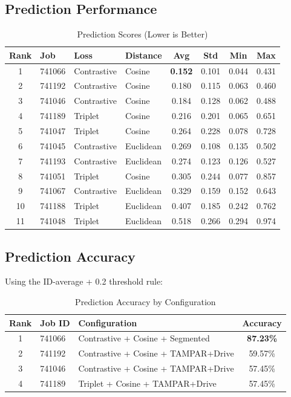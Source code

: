 \documentclass[12pt,a4paper]{article}
\begin{document}
\subsection{Prediction Performance}

\begin{table}[H]
\centering
\caption{Prediction Scores (Lower is Better)}
\label{tab:prediction_scores}
\begin{tabular}{clllcccc}
\toprule
\textbf{Rank} & \textbf{Job} & \textbf{Loss} & \textbf{Distance} & \textbf{Avg} & \textbf{Std} & \textbf{Min} & \textbf{Max} \\
\midrule
1 & 741066 & Contrastive & Cosine & \textbf{0.152} & 0.101 & 0.044 & 0.431 \\
2 & 741192 & Contrastive & Cosine & 0.180 & 0.115 & 0.063 & 0.460 \\
3 & 741046 & Contrastive & Cosine & 0.184 & 0.128 & 0.062 & 0.488 \\
4 & 741189 & Triplet & Cosine & 0.216 & 0.201 & 0.065 & 0.651 \\
5 & 741047 & Triplet & Cosine & 0.264 & 0.228 & 0.078 & 0.728 \\
6 & 741045 & Contrastive & Euclidean & 0.269 & 0.108 & 0.135 & 0.502 \\
7 & 741193 & Contrastive & Euclidean & 0.274 & 0.123 & 0.126 & 0.527 \\
8 & 741051 & Triplet & Cosine & 0.305 & 0.244 & 0.077 & 0.857 \\
9 & 741067 & Contrastive & Euclidean & 0.329 & 0.159 & 0.152 & 0.643 \\
10 & 741188 & Triplet & Euclidean & 0.407 & 0.185 & 0.242 & 0.762 \\
11 & 741048 & Triplet & Euclidean & 0.518 & 0.266 & 0.294 & 0.974 \\
\bottomrule
\end{tabular}
\end{table}

\subsection{Prediction Accuracy}

Using the ID-average + 0.2 threshold rule:

\begin{table}[H]
\centering
\caption{Prediction Accuracy by Configuration}
\label{tab:prediction_accuracy}
\begin{tabular}{cllc}
\toprule
\textbf{Rank} & \textbf{Job ID} & \textbf{Configuration} & \textbf{Accuracy} \\
\midrule
1 & 741066 & Contrastive + Cosine + Segmented & \textbf{87.23\%} \\
2 & 741192 & Contrastive + Cosine + TAMPAR+Drive & 59.57\% \\
3 & 741046 & Contrastive + Cosine + TAMPAR+Drive & 57.45\% \\
4 & 741189 & Triplet + Cosine + TAMPAR+Drive & 57.45\% \\
\bottomrule
\end{tabular}
\end{table}
\end{document}
